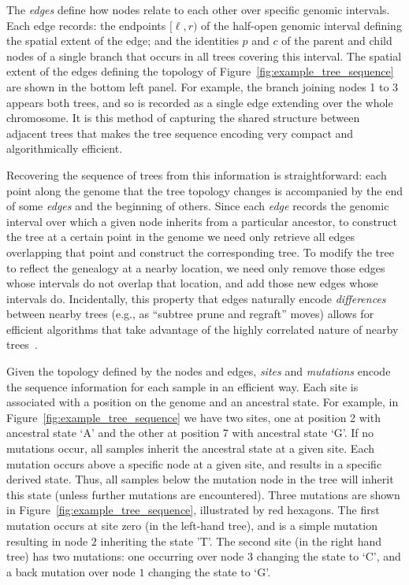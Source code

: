 \documentclass{article}
\begin{document}
The \emph{edges} define how nodes relate to each other over specific genomic intervals.
Each edge records:
the endpoints $[\ell, r)$ of the half-open genomic interval defining the
spatial extent of the edge;
and the identities $p$ and $c$ of the parent and child nodes
of a single branch that occurs in all trees covering this interval.
The spatial extent of the edges defining the topology of Figure~\ref{fig:example_tree_sequence}
are shown in the bottom left panel.
For example, the branch joining nodes 1 to 3 appears both trees,
and so is recorded as a single edge extending over the whole chromosome.
It is this method of capturing the shared structure between adjacent trees that makes the
tree sequence encoding very compact and algorithmically efficient.

Recovering the sequence of trees from this information is straightforward:
each point along the genome that the tree topology changes
is accompanied by the end of some \emph{edges} and the beginning of others.
Since each \emph{edge} records the genomic interval
over which a given node inherits from a particular ancestor,
to construct the tree at a certain point in the genome
we need only retrieve all edges overlapping that point
and construct the corresponding tree.
To modify the tree to reflect the genealogy at a nearby location,
we need only remove those edges whose intervals do not overlap that location,
and add those new edges whose intervals do.
Incidentally, this property that edges naturally encode \emph{differences}
between nearby trees (e.g., as ``subtree prune and regraft'' moves)
allows for efficient algorithms that take advantage
of the highly correlated nature of nearby trees~\citep{kelleher2016efficient}.

Given the topology defined by the nodes and edges, \emph{sites} and \emph{mutations}
encode the sequence information for each sample in an efficient way. Each site
is associated with a position on the genome and an ancestral state. For example,
in Figure~\ref{fig:example_tree_sequence} we have two sites, one at position
2 with ancestral state `A' and the other at position 7 with ancestral state `G'. If
no mutations occur, all samples inherit the ancestral state at a given site.
Each mutation occurs above a specific node at a given site,
and results in a specific derived state.
Thus, all samples below the mutation node in the tree will inherit this state
(unless further mutations are encountered).
Three mutations are shown in Figure~\ref{fig:example_tree_sequence},
illustrated by red hexagons.
The first mutation occurs at site zero (in the left-hand tree), and is a simple
mutation resulting in node $2$ inheriting the state 'T'.
The second site (in the right hand tree) has two mutations:
one occurring over node $3$ changing the state to `C',
and a back mutation over node $1$ changing the state to `G'.
\end{document}
